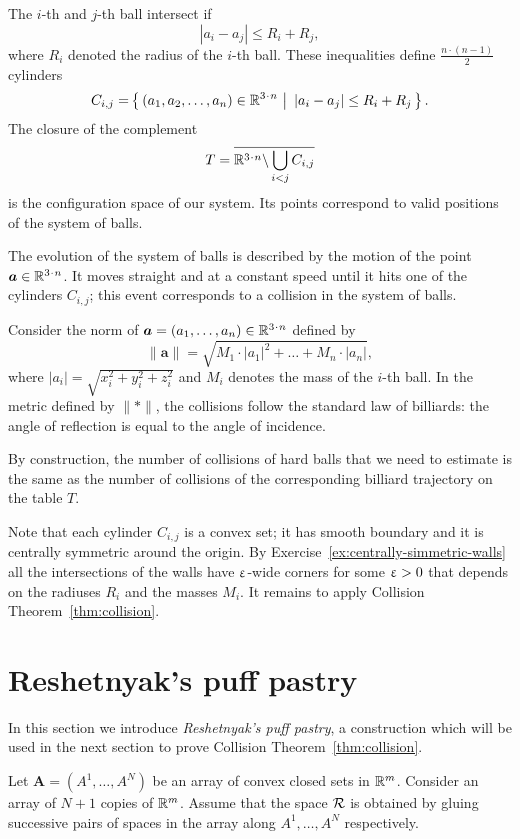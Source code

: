 The $i$-th and $j$-th ball intersect if 
$$|a_i - a_j | \le R_i+R_j,$$
where $R_i$ denoted the radius of the $i$-th ball.
These inequalities define $\tfrac{n\cdot(n-1)}{2}$ cylinders 
\[C_{i,j}=\set{(a_1, a_2 , \dots , a_n )\in\RR^{3\cdot n}} {|a_i - a_j | \le R_i+R_j}.\] 
The closure of the complement
\[T=\overline{\RR^{3\cdot n}\backslash \bigcup_{i< j} C_{i,j}}\] 
is the configuration space of our system. 
Its points correspond
to valid positions of the system of balls.

The evolution of the system
of balls is described by the motion of
the point $\bm{a}\in\RR^{3\cdot n}$.
It moves straight and at a
constant speed until it hits one of the cylinders $C_{i,j}$; 
this event corresponds
to a collision in the system of balls.

Consider the norm of $\bm{a}=(a_1,\dots,a_n)\in \RR^{3\cdot n}$ defined by
\[\lVert \bm{a}\rVert=\sqrt{M_1\cdot|a_1|^2+\dots+M_n\cdot |a_n|},\]
where $|a_i|=\sqrt{x_i^2+y_i^2+z_i^2}$ 
and $M_i$ denotes the mass of the $i$-th ball.
In the metric defined by $\lVert {*}\rVert$,
the collisions follow the
standard law of billiards: 
the angle of reflection is equal to the angle
of incidence. 

By construction, the number of collisions of hard balls that we need to estimate 
is the same as the number of collisions of the corresponding billiard trajectory on the table $T$.

Note that each cylinder $C_{i,j}$ is a convex set;
it has smooth boundary 
and it is centrally symmetric around the origin.
By Exercise~\ref{ex:centrally-simmetric-walls} all the intersections of the walls have $\upvarepsilon$-wide corners for some $\upvarepsilon>0$ that depends on the radiuses $R_i$ and the masses $M_i$.
It remains to apply Collision Theorem~\ref{thm:collision}.
\qeds

\section{Reshetnyak's puff pastry}\label{sec:puff-pastry}

In this section we introduce \emph{Reshetnyak's puff pastry}, 
a construction which will be used in the next section to prove Collision Theorem~\ref{thm:collision}.

Let $\bm{A}=(A^1,\dots,A^N)$ be an array of convex closed sets in $\mathbb{R}^m$.
Consider an array of $N+1$ copies of $\mathbb{R}^m$.
Assume that the space $\mathcal{R}$ is 
obtained by
gluing successive pairs of spaces in the array  
along $A^1,\dots,A^N$ respectively.

